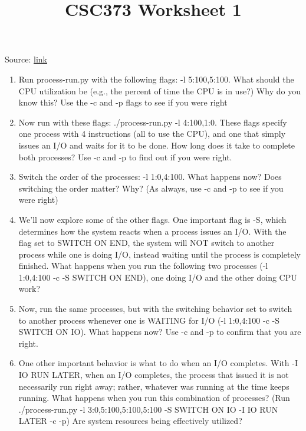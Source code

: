 \documentclass[12pt]{article}
\begin{document}
\title{CSC373 Worksheet 1}
\maketitle

\bigskip

Source: \href{http://pages.cs.wisc.edu/~remzi/OSTEP/cpu-intro.pdf}{link}

\bigskip

\begin{enumerate}[1.]
    \item Run process-run.py with the following flags: -l 5:100,5:100.
    What should the CPU utilization be (e.g., the percent of time the
    CPU is in use?) Why do you know this? Use the -c and -p flags to
    see if you were right

    \item  Now run with these flags: ./process-run.py -l 4:100,1:0.
    These flags specify one process with 4 instructions (all to use the
    CPU), and one that simply issues an I/O and waits for it to be done.
    How long does it take to complete both processes? Use -c and -p
    to find out if you were right.

    \item Switch the order of the processes: -l 1:0,4:100. What happens
    now? Does switching the order matter? Why? (As always, use -c
    and -p to see if you were right)

    \item We’ll now explore some of the other flags. One important flag is
    -S, which determines how the system reacts when a process issues an I/O. With the flag set to SWITCH ON END, the system
    will NOT switch to another process while one is doing I/O, instead waiting until the process is completely finished. What happens when you run the following two processes (-l 1:0,4:100
    -c -S SWITCH ON END), one doing I/O and the other doing CPU
    work?

    \item Now, run the same processes, but with the switching behavior set
    to switch to another process whenever one is WAITING for I/O (-l
    1:0,4:100 -c -S SWITCH ON IO). What happens now? Use -c
    and -p to confirm that you are right.

    \item  One other important behavior is what to do when an I/O completes. With -I IO RUN LATER, when an I/O completes, the process that issued it is not necessarily run right away; rather, whatever
    was running at the time keeps running. What happens when you
    run this combination of processes? (Run ./process-run.py -l
    3:0,5:100,5:100,5:100 -S SWITCH ON IO -I IO RUN LATER
    -c -p) Are system resources being effectively utilized?


\end{enumerate}
\end{document}
